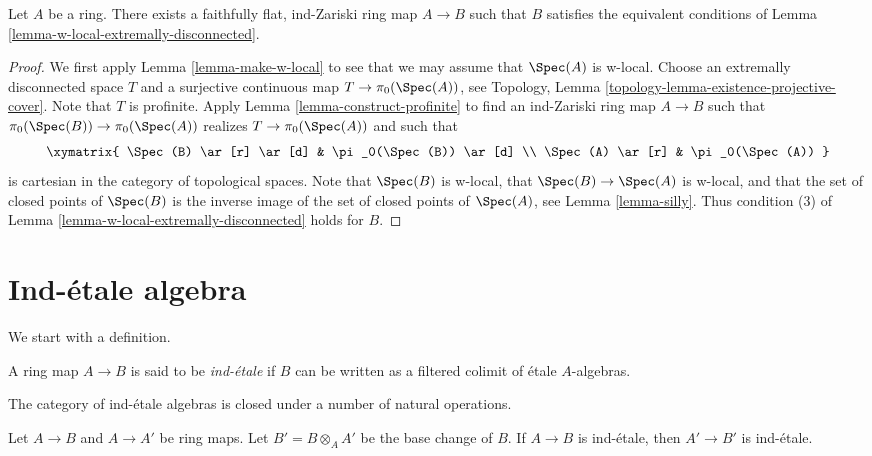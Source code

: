 \begin{lemma}
\label{lemma-find-Zariski-w-contractible}
Let $A$ be a ring. There exists a faithfully flat, ind-Zariski ring
map $A \to B$ such that $B$ satisfies the equivalent conditions
of Lemma \ref{lemma-w-local-extremally-disconnected}.
\end{lemma}

\begin{proof}
We first apply Lemma \ref{lemma-make-w-local} to see that we may assume that
$\Spec(A)$ is w-local.
Choose an extremally disconnected space $T$ and a surjective
continuous map $T \to \pi_0(\Spec(A))$, see
Topology, Lemma \ref{topology-lemma-existence-projective-cover}.
Note that $T$ is profinite. Apply Lemma \ref{lemma-construct-profinite}
to find an ind-Zariski ring map $A \to B$ such that
$\pi_0(\Spec(B)) \to \pi_0(\Spec(A))$ realizes $T \to \pi_0(\Spec(A))$
and such that
$$
\xymatrix{
\Spec(B) \ar[r] \ar[d] & \pi_0(\Spec(B)) \ar[d] \\
\Spec(A) \ar[r] & \pi_0(\Spec(A))
}
$$
is cartesian in the category of topological spaces. Note that $\Spec(B)$
is w-local, that $\Spec(B) \to \Spec(A)$ is w-local, and that the
set of closed points of $\Spec(B)$ is the inverse image of the
set of closed points of $\Spec(A)$, see Lemma \ref{lemma-silly}.
Thus condition (3) of
Lemma \ref{lemma-w-local-extremally-disconnected}
holds for $B$.
\end{proof}





\section{Ind-\'etale algebra}
\label{section-ind-etale}

\noindent
We start with a definition.

\begin{definition}
\label{definition-ind-etale}
A ring map $A \to B$ is said to be {\it ind-\'etale} if $B$ can be written
as a filtered colimit of \'etale $A$-algebras.
\end{definition}

\noindent
The category of ind-\'etale algebras is closed under a number of natural
operations.

\begin{lemma}
\label{lemma-base-change-ind-etale}
Let $A \to B$ and $A \to A'$ be ring maps. Let $B' = B \otimes_A A'$
be the base change of $B$.
If $A \to B$ is ind-\'etale, then $A' \to B'$ is ind-\'etale.
\end{lemma}

